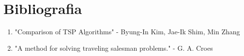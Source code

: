 \documentclass{article}
\begin{document}
\section{Bibliografia}


\begin{enumerate}
\item "Comparison of TSP Algorithms" - Byung-In Kim, Jae-Ik Shim, Min Zhang %
\item "A method for solving traveling salesman problems." - G. A. Croes
\end{enumerate}
\end{document}
